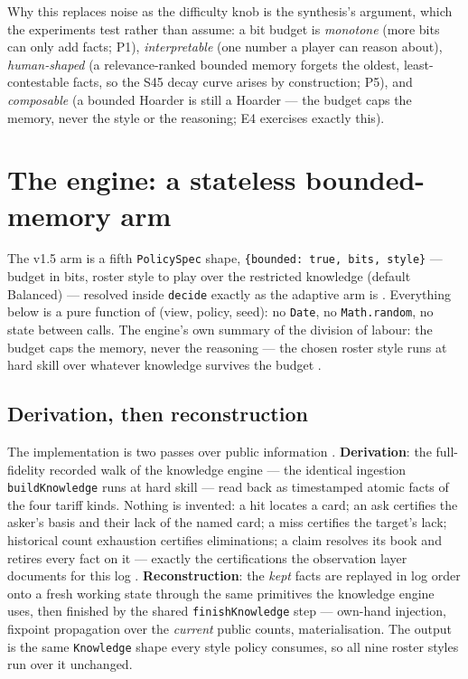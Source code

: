 \documentclass[11pt]{article}
\newcommand{\code}[1]{\texttt{#1}}
\begin{document}
Why this replaces noise as the difficulty knob is the synthesis's argument, which the
experiments test rather than assume: a bit budget is \emph{monotone} (more bits can only
add facts; P1), \emph{interpretable} (one number a player can reason about),
\emph{human-shaped} (a relevance-ranked bounded memory forgets the oldest,
least-contestable facts, so the S45 decay curve arises by construction; P5), and
\emph{composable} (a bounded Hoarder is still a Hoarder --- the budget caps the memory,
never the style or the reasoning; E4 exercises exactly this).

\section{The engine: a stateless bounded-memory arm}
\label{sec:engine}

The v1.5 arm is a fifth \code{PolicySpec} shape, \code{\{bounded: true, bits, style\}}
--- budget in bits, roster style to play over the restricted knowledge (default
Balanced) --- resolved inside \code{decide} exactly as the adaptive arm is
\cite{v10paper,repo}. Everything below is a pure function of (view, policy, seed): no
\code{Date}, no \code{Math.random}, no state between calls. The engine's own summary of
the division of labour: the budget caps the memory, never the reasoning --- the chosen
roster style runs at hard skill over whatever knowledge survives the budget
\cite{repo}.

\subsection{Derivation, then reconstruction}
\label{sec:twopasses}

The implementation is two passes over public information \cite{repo}.
\textbf{Derivation}: the full-fidelity recorded walk of the knowledge engine --- the
identical ingestion \code{buildKnowledge} runs at hard skill --- read back as
timestamped atomic facts of the four tariff kinds. Nothing is invented: a hit locates a
card; an ask certifies the asker's basis and their lack of the named card; a miss
certifies the target's lack; historical count exhaustion certifies eliminations; a claim
resolves its book and retires every fact on it --- exactly the certifications the
observation layer documents for this log \cite{obspaper}. \textbf{Reconstruction}: the
\emph{kept} facts are replayed in log order onto a fresh working state through the same
primitives the knowledge engine uses, then finished by the shared
\code{finishKnowledge} step --- own-hand injection, fixpoint propagation over the
\emph{current} public counts, materialisation. The output is the same \code{Knowledge}
shape every style policy consumes, so all nine roster styles run over it unchanged.
\end{document}
